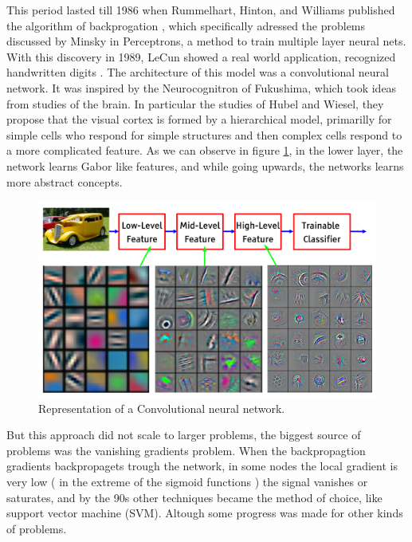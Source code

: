 \documentclass[12pt, a4paper, titlepage,twoside,openright]{article}
\begin{document}
This period lasted till 1986 when Rummelhart, Hinton, and Williams published the algorithm of backprogation \cite{Rumelhart}, which specifically adressed the problems discussed by Minsky in Perceptrons, a method to train multiple layer neural nets. With this discovery in 1989, LeCun showed a real world application, recognized handwritten digits \cite{lecunZip}. The architecture of this model was a convolutional neural network. It was inspired by the Neurocognitron \cite{Fukushima} of Fukushima, which took ideas from studies of the brain. In particular the studies of Hubel and Wiesel, they propose that the visual cortex is formed by a hierarchical model, primarilly for simple cells who respond for simple structures and then complex cells respond to a more complicated feature. As we can observe in figure \ref{intro1}, in the lower layer, the network learns Gabor like features, and while going upwards, the networks learns more abstract concepts.




\begin{figure}[H]
\centering         
\includegraphics[width=12cm]{intro/model.png}
\caption{Representation of a Convolutional neural network.} \label{intro1}
\end{figure}



But this approach did not scale to larger problems, the biggest source of problems was the vanishing gradients problem. When the backpropagtion gradients backpropagets trough the network, in some nodes the local gradient is very low ( in the extreme of the sigmoid functions ) the signal vanishes or saturates, and by the 90s other techniques became the method of choice, like support vector machine (SVM). Altough some progress was made for other kinds of problems.
\end{document}
